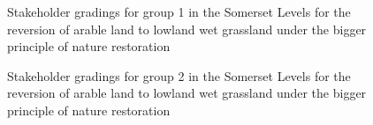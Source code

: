 \documentclass[
  12pt,
  letterpaper,
  DIV=11,
  numbers=noendperiod]{scrartcl}
\begin{document}
\begin{figure}[H]
{}

\caption{\label{fig-SomArBigG1}Stakeholder gradings for group 1 in the
Somerset Levels for the reversion of arable land to lowland wet
grassland under the bigger principle of nature restoration}

\end{figure}%

\begin{figure}[H]


\caption{\label{fig-SomArBigG2}Stakeholder gradings for group 2 in the
Somerset Levels for the reversion of arable land to lowland wet
grassland under the bigger principle of nature restoration}

\end{figure}%
\end{document}
